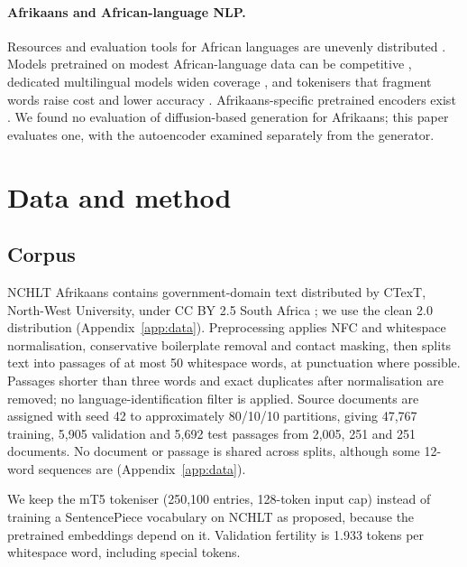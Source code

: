 \documentclass[11pt,a4paper]{article}
\begin{document}
\paragraph{Afrikaans and African-language NLP.}
Resources and evaluation tools for African languages are unevenly distributed \citep{joshi2020state,nekoto2020participatory}. Models pretrained on modest African-language data can be competitive \citep{ogueji2021small}, dedicated multilingual models widen coverage \citep{adebara2023serengeti}, and tokenisers that fragment words raise cost and lower accuracy \citep{lundin2025token}. Afrikaans-specific pretrained encoders exist \citep{ralethe2020adaptation}. We found no evaluation of diffusion-based generation for Afrikaans; this paper evaluates one, with the autoencoder examined separately from the generator.

\section{Data and method}
\label{sec:method}

\subsection{Corpus}
NCHLT Afrikaans contains government-domain text distributed by CTexT, North-West University, under CC BY 2.5 South Africa \citep{eiselen2014developing}; we use the clean 2.0 distribution (Appendix~\ref{app:data}). Preprocessing applies NFC and whitespace normalisation, conservative boilerplate removal and contact masking, then splits text into passages of at most 50 whitespace words, at punctuation where possible. Passages shorter than three words and exact duplicates after normalisation are removed; no language-identification filter is applied. Source documents are assigned with seed 42 to approximately 80/10/10 partitions, giving 47,767 training, 5,905 validation and 5,692 test passages from 2,005, 251 and 251 documents. No document or passage is shared across splits, although some 12-word sequences are (Appendix~\ref{app:data}).

We keep the mT5 tokeniser (250,100 entries, 128-token input cap) instead of training a SentencePiece vocabulary \citep{kudo2018sentencepiece} on NCHLT as proposed, because the pretrained embeddings depend on it. Validation fertility is 1.933 tokens per whitespace word, including special tokens.
\end{document}
